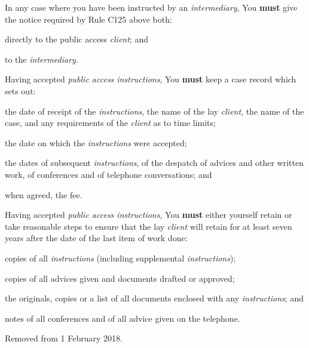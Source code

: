 
In any case where you have been instructed by an \emph{intermediary},
You \textcolor{myred}{\textbf{must}} give the notice required by Rule C125 above both:
\begin{numlist}\item directly to the public access \emph{client}; and
\item to the \emph{intermediary}.
\end{numlist}

Having accepted \emph{public access instructions}, You \textcolor{myred}{\textbf{must}} keep a case
record which sets out:
\begin{numlist}\item the date of receipt of the \emph{instructions}, the name of the lay
\emph{client}, the name of the case, and any requirements of the
\emph{client} as to time limits;
\item the date on which the \emph{instructions} were accepted;
\item the dates of subsequent \emph{instructions}, of the despatch of
advices and other written work, of conferences and of telephone
conversations; and
\item when agreed, the fee.
\end{numlist}

Having accepted \emph{public access instructions}, You \textcolor{myred}{\textbf{must}} either
yourself retain or take reasonable steps to ensure that the lay
\emph{client} will retain for at least seven years after the date of the
last item of work done:
\begin{numlist}\item copies of all \emph{instructions} (including supplemental
\emph{instructions});
\item copies of all advices given and documents drafted or approved;
\item the originals, copies or a list of all documents enclosed with any
\emph{instructions}; and
\item notes of all conferences and of all advice given on the telephone.
\end{numlist}

Removed from 1 February 2018.


